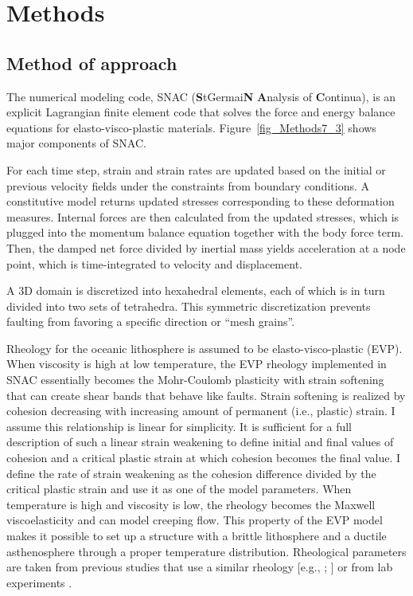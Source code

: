 \pagebreak
\section{Methods}
\label{ch:Methods}

\subsection{Method of approach}
The numerical modeling code, SNAC (\textbf{S}tGermai\textbf{N} \textbf{A}nalysis of \textbf{C}ontinua), is an explicit Lagrangian finite element code that solves the force and energy  balance equations for elasto-visco-plastic materials. Figure~\ref{fig_Methods7_3} shows major components of SNAC.

For each time step, strain and strain rates are updated based on the initial or previous velocity fields under the constraints from boundary conditions. A constitutive model returns updated stresses corresponding to these deformation measures. Internal forces are then calculated from the updated stresses, which is plugged into the momentum balance equation together with the body force term. Then, the damped  net force divided by inertial mass yields acceleration at a node point, which is time-integrated to velocity and displacement.

A 3D domain is discretized into hexahedral elements, each of which is in turn divided into two sets of tetrahedra. This symmetric discretization prevents faulting from favoring a specific direction or ``mesh grains''. 

Rheology for the oceanic lithosphere is assumed to be elasto-visco-plastic (EVP). When viscosity is high at low temperature, the EVP rheology implemented in SNAC essentially becomes the Mohr-Coulomb plasticity with strain softening that can create shear bands that behave like faults. Strain softening is realized by cohesion decreasing with increasing amount of permanent (i.e., plastic) strain. I assume this relationship is linear for simplicity. It is sufficient for a full description of such a linear strain weakening to define initial and final values of cohesion and a critical plastic strain at which cohesion becomes the final value. I define the rate of strain weakening as the cohesion difference divided by the critical plastic strain and use it as one of the model parameters. When temperature is high and viscosity is low, the rheology becomes the Maxwell viscoelasticity and can model creeping flow. This property of the EVP model makes it possible to set up a structure with a brittle lithosphere and a ductile asthenosphere through a proper temperature distribution. Rheological parameters are taken from previous studies that use a similar rheology [e.g., \citealp{Buck2005}; \citealp{Tucholke2008}] or from lab experiments \citep[e.g.,][]{Kirby1987}. 

